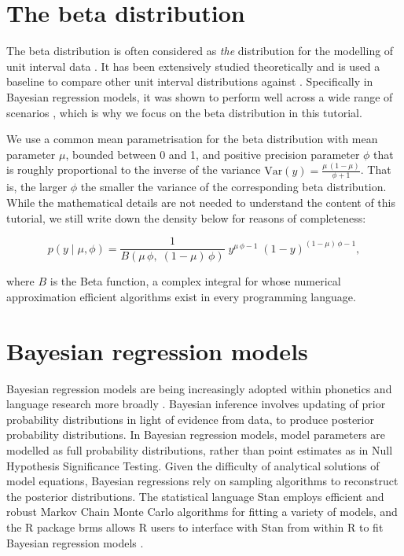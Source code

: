 \documentclass[
  authoryear,
  preprint,
  3p]{elsarticle}
\begin{document}
\section{The beta distribution}\label{sec-beta}

The beta distribution is often considered as \emph{the} distribution for
the modelling of unit interval data
\citep{ferrari_beta_2004, cribari-neto_beta_2010}. It has been
extensively studied theoretically
\citep{krysicki_new_1999, gupta_handbook_2014, espinheira_beta_2008} and
is used a baseline to compare other unit interval distributions against
\citep{kieschnick_regression_2003, bonat_regression_2013, lopez_bayesian_2013}.
Specifically in Bayesian regression models, it was shown to perform well
across a wide range of scenarios
\citep{scholz_posterior_2023, scholz_prediction_2025}, which is why we
focus on the beta distribution in this tutorial.

We use a common mean parametrisation for the beta distribution with mean
parameter \(\mu\), bounded between 0 and 1, and positive precision
parameter \(\phi\) that is roughly proportional to the inverse of the
variance \(\text{Var}(y) = \frac{\mu \, (1 - \mu)}{\phi + 1}\). That is,
the larger \(\phi\) the smaller the variance of the corresponding beta
distribution. While the mathematical details are not needed to
understand the content of this tutorial, we still write down the density
below for reasons of completeness:

\[
p(y \mid \mu, \phi) = \frac{1}{B(\mu \, \phi, \; (1-\mu) \, \phi)} \; y^{\mu \, \phi -1} \; (1-y)^{(1-\mu) \, \phi -1},
\]

where \(B\) is the Beta function, a complex integral for whose numerical
approximation efficient algorithms exist in every programming language.

\section{Bayesian regression models}\label{sec-bayes}

Bayesian regression models are being increasingly adopted within
phonetics and language research more broadly
\citep{vasishth2018, nalborczyk2019, verissimo2021}. Bayesian inference
involves updating of prior probability distributions in light of
evidence from data, to produce posterior probability distributions. In
Bayesian regression models, model parameters are modelled as full
probability distributions, rather than point estimates as in Null
Hypothesis Significance Testing. Given the difficulty of analytical
solutions of model equations, Bayesian regressions rely on sampling
algorithms to reconstruct the posterior distributions. The statistical
language Stan \citep{standevelopmentteam2017} employs efficient and
robust Markov Chain Monte Carlo algorithms for fitting a variety of
models, and the R package brms allows R users to interface with Stan
from within R to fit Bayesian regression models
\citep{burkner2017, burkner2018, burkner2021}.
\end{document}
